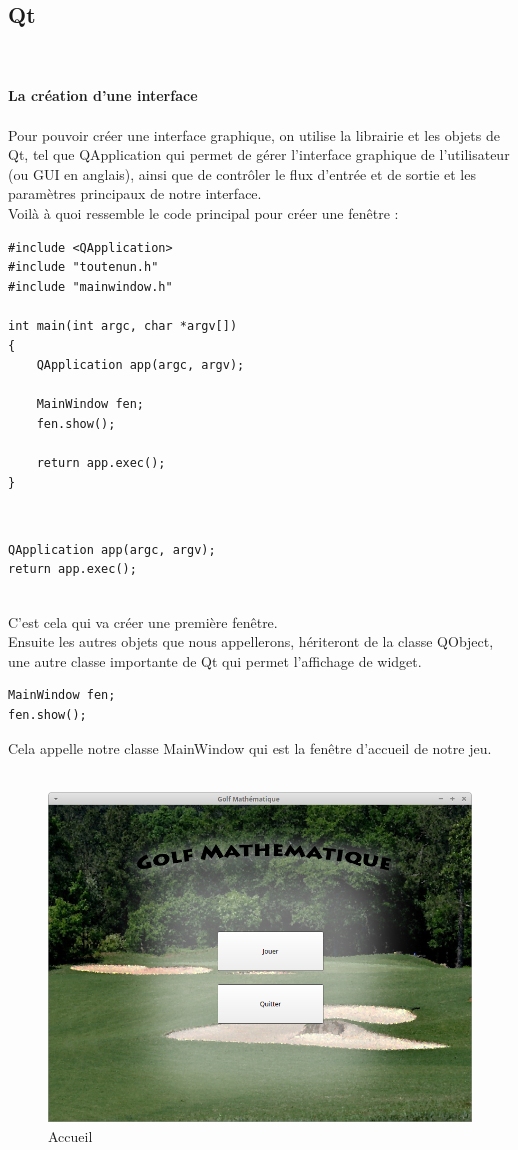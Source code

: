 \documentclass{article}
\begin{document}
\subsection{Qt}
~\\~\\
\textbf{\large La création d'une interface}
\\~\\
Pour pouvoir créer une interface graphique, on utilise la librairie et les objets de Qt, tel que QApplication qui permet de gérer l'interface graphique de l'utilisateur (ou GUI en anglais), ainsi que de contrôler le flux d'entrée et de sortie et les paramètres principaux de notre interface.\\
Voilà à quoi ressemble le code principal pour créer une fenêtre :\\
\begin{verbatim}
#include <QApplication>
#include "toutenun.h"
#include "mainwindow.h"

int main(int argc, char *argv[])
{
    QApplication app(argc, argv);

    MainWindow fen;
    fen.show();

    return app.exec();
}
\end{verbatim}
~\\
\begin{verbatim}
QApplication app(argc, argv);
return app.exec();
\end{verbatim}
~\\
C'est cela qui va créer une première fenêtre.\\
Ensuite les autres objets que nous appellerons, hériteront de la classe QObject, une autre classe importante de Qt qui permet l'affichage de widget.\\
\begin{verbatim}
MainWindow fen;
fen.show();
\end{verbatim}
Cela appelle notre classe MainWindow qui est la fenêtre d'accueil de notre jeu.\\~\\
\begin{figure}[!h]
\centering 
\includegraphics[scale=0.3]{Images/accueil.png}
\caption{Accueil}
\end{figure}
\end{document}
